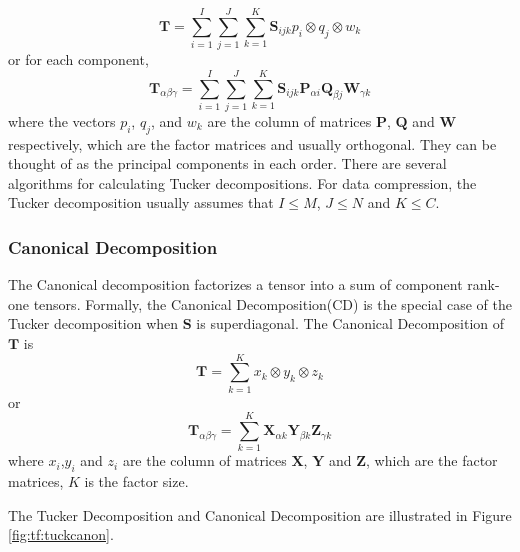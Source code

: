 \begin{equation*}
\mathbf{T}=\sum\limits_{i=1}^{I}\sum\limits_{j=1}^{J}\sum\limits_{k=1}^{K}\mathbf{S}_{ijk}p_i\otimes q_j\otimes w_k
\end{equation*}
or for each component,
\begin{equation*}
\mathbf{T}_{\alpha\beta\gamma}=\sum\limits_{i=1}^{I}\sum\limits_{j=1}^{J}\sum\limits_{k=1}^{K}\mathbf{S}_{ijk}\mathbf{P}_{\alpha i}\mathbf{Q}_{\beta j}\mathbf{W}_{\gamma k}
\end{equation*}
where the vectors $p_i$, $q_j$, and $w_k$ are the column of matrices $\mathbf{P}$, $\mathbf{Q}$ and $\mathbf{W}$ respectively, which are the factor matrices and usually orthogonal.
They can be thought of as the principal components in each order.
There are several algorithms for calculating Tucker decompositions.
For data compression, the Tucker decomposition usually assumes that $I\le M$, $J \le N $ and $K \le C$.

\subsubsection{Canonical Decomposition}

The Canonical decomposition factorizes a tensor into a sum of component rank-one tensors.
Formally, the Canonical Decomposition(CD) is the special case of the Tucker decomposition when $\mathbf{S}$ is superdiagonal.
The Canonical Decomposition of $\mathbf{T}$ is
\begin{equation*}
\mathbf{T}=\sum\limits_{k=1}^{K}x_k\otimes y_k\otimes z_k
\end{equation*}
or
\begin{equation*}
\mathbf{T}_{\alpha\beta\gamma}=\sum\limits_{k=1}^{K}\mathbf{X}_{\alpha k} \mathbf{Y}_{\beta k} \mathbf{Z}_{\gamma k}
\end{equation*}
where $x_i$,$y_i$ and $z_i$ are the column of matrices $\mathbf{X}$, $\mathbf{Y}$ and $\mathbf{Z}$, which are the factor matrices, $K$ is the factor size. 

The Tucker Decomposition and Canonical Decomposition are illustrated in Figure \ref{fig:tf:tuckcanon}.

